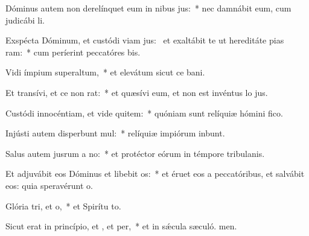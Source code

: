 \item Dóminus autem non derelínquet eum in nibus jus:~* nec damnábit eum, cum judicábi li.
\item Exspécta Dóminum, et custódi viam jus:~\pscross{} et exaltábit te ut hereditáte pias ram:~* cum períerint peccatóres bis.
\item Vidi ímpium superaltum,~* et elevátum sicut ce bani.
\item Et transívi, et ce non rat:~* et quæsívi eum, et non est invéntus lo jus.
\item Custódi innocéntiam, et vide quitem:~* quóniam sunt relíquiæ hómini fico.
\item Injústi autem disperbunt mul:~* relíquiæ impiórum inbunt.
\item Salus autem jusrum a no:~* et protéctor eórum in témpore tribulanis.
\item Et adjuvábit eos Dóminus et libebit os:~* et éruet eos a peccatóribus, et salvábit eos: quia speravérunt  o.
\item Glória tri, et o,~* et Spirítu to.
\item Sicut erat in princípio, et , et per,~* et in sǽcula sæculó. men.

